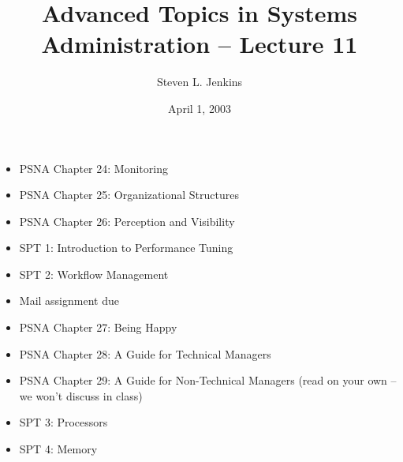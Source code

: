 \documentclass{slides}
\title{Advanced Topics in Systems Administration -- Lecture 11}
\author{Steven L. Jenkins}
\date{April 1, 2003}
\newcommand{\bi}{\begin{itemize}}
\newcommand{\ei}{\end{itemize}}
\begin{document}
\maketitle


\bi
\item PSNA Chapter 24: Monitoring
\item PSNA Chapter 25: Organizational Structures
\item PSNA Chapter 26: Perception and Visibility
\item SPT 1: Introduction to Performance Tuning
\item SPT 2: Workflow Management
\ei


\bi
\item Mail assignment due
\item PSNA Chapter 27: Being Happy
\item PSNA Chapter 28: A Guide for Technical Managers
\item PSNA Chapter 29: A Guide for Non-Technical Managers
  (read on your own -- we won't discuss in class)
\item SPT 3: Processors
\item SPT 4: Memory
\ei
\end{document}
